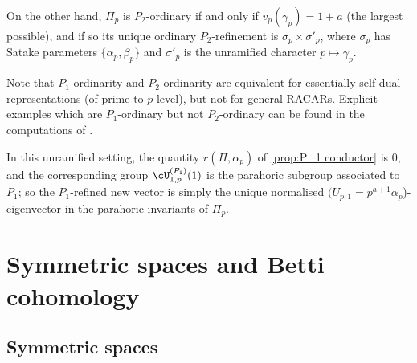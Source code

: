 \documentclass[10pt,reqno,a4paper]{amsart}
\begin{document}
On the other hand, $\Pi_p$ is $P_2$-ordinary if and only if $v_p(\gamma_p) = 1 + a$ (the largest possible), and if so its unique ordinary $P_2$-refinement is $\sigma_p \times \sigma'_p$, where $\sigma_p$ has Satake parameters $\{\alpha_p, \beta_p\}$ and $\sigma'_p$ is the unramified character $p \mapsto \gamma_p$.

\begin{remark}
Note that $P_1$-ordinarity and $P_2$-ordinarity are equivalent for essentially self-dual representations (of prime-to-$p$ level), but not for general RACARs. Explicit examples which are $P_1$-ordinary but not $P_2$-ordinary can be found in the computations of \cite{GKTV97}.%
\end{remark}

In this unramified setting, the quantity $r(\Pi, \alpha_p)$ of \cref{prop:P_1 conductor} is 0, and the corresponding group $\cU_{1, p}^{(P_1)}(1)$ is the parahoric subgroup associated to $P_1$; so the $P_1$-refined new vector is simply the unique normalised $(U_{p, 1} = p^{a + 1} \alpha_p$)-eigenvector in the parahoric invariants of $\Pi_p$.


\section{Symmetric spaces and Betti cohomology}

\subsection{Symmetric spaces}\label{sec:symmetric spaces}
\end{document}
